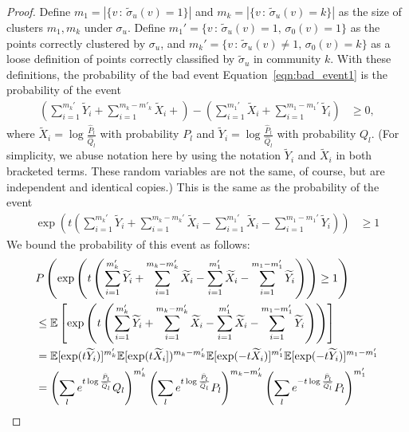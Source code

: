 \documentclass{article}
\begin{document}
\begin{proof}
Define $m_1 = |\{ v \,:\, \tilde \sigma_u(v) = 1 \}|$ and $m_k = | \{ v \,:\, \tilde \sigma_u(v) = k \}|$ as the size of clusters $m_1, m_k$ under $\sigma_u$. Define  $m_1' = \{ v \,:\, \tilde \sigma_u(v) = 1 ,\, \sigma_0(v) = 1\}$ as the points correctly clustered by $\sigma_u$, and $m_k' = \{ v \,:\, \tilde \sigma_u(v) \neq  1,\, \sigma_0(v) = k \}$ as a loose definition of points correctly classified by $\tilde \sigma_u$ in community $k$. With these definitions, the probability of the bad event Equation~\ref{eqn:bad_event1} is the probability of the event
\begin{align*}
\left( \sum_{i=1}^{m_k'} \tilde{Y}_i + \sum_{i=1}^{m_k - m'_k} \tilde{X}_i + \right) - 
\left( \sum_{i=1}^{m_1'} \tilde{X}_i + \sum_{i=1}^{m_1 - m_1'} \tilde{Y}_i  \right) &\geq 0,
\end{align*}
where $\tilde{X}_i = \log \frac{\hat{P}_l}{\hat{Q}_l}$ with probability $P_l$ and $\tilde{Y}_i = \log \frac{\hat{P}_l}{\hat{Q}_l}$ with probability $Q_l$. (For simplicity, we abuse notation here by using the notation $\tilde Y_i$ and $\tilde X_i$ in both bracketed terms. These random variables are not the same, of course, but are independent and identical copies.) This is the same as the probability of the event
\begin{align*}
\exp \left( t \left( \sum_{i=1}^{m_k'} \tilde{Y}_i + \sum_{i=1}^{m_k - m_k'} \tilde{X}_i - 
     \sum_{i=1}^{m_1'}  \tilde{X}_i - \sum_{i=1}^{m_1 - m_1'} \tilde{Y}_i  \right) \right) &\geq 1 
\end{align*}
We bound the probability of this event as follows:
\begin{align*}
& P \left( \exp \left( t \left( \sum_{i=1}^{m_k'} \tilde{Y}_i + \sum_{i=1}^{m_k - m_k'} \tilde{X}_i- 
     \sum_{i=1}^{m_1'}  \tilde{X}_i - \sum_{i=1}^{m_1 - m_1'} \tilde{Y}_i  \right) \right) \geq 1 \right) \\ 
&\leq \E \left[ 
\exp\left( t \left( \sum_{i=1}^{m_k'} \tilde{Y}_i + \sum_{i=1}^{m_k - m_k'} \tilde{X}_i - 
     \sum_{i=1}^{m_1'}  \tilde{X}_i - \sum_{i=1}^{m_1 - m_1'} \tilde{Y}_i  \right) \right)
 \right] \\ 
&=  \E[\exp( t \tilde{Y}_i) ]^{m_k'} 
     \E[ \exp(t \tilde{X}_i ]) ^{m_k - m_k'}  
    \E[ \exp( - t \tilde{X}_i)] ^{m_1'} 
    \E[ \exp( -t \tilde{Y}_i )] ^{m_1 - m_1'} \\
&= \left( \sum_l e^{t \log \frac{\hat{P}_l}{\hat{Q}_l} } Q_l \right)^{m_k'}  
      \left( \sum_l e^{t \log \frac{\hat{P}_l}{\hat{Q}_l}} P_l \right)^{m_k - m_k'} 
      \left( \sum_l e^{- t \log \frac{\hat{P}_l}{\hat{Q_l}} } P_l \right)^{m_1'}

\end{align*}
\end{proof}
\end{document}
